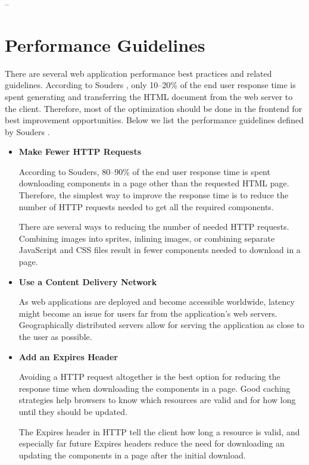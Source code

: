 --

\clearpage
\section{Performance Guidelines}
\label{section:performance-guidelines}

There are several web application performance best practices and
related guidelines. According to Souders \cite{souders2007high}, only
10--20\% of the end user response time is spent generating and
transferring the HTML document from the web server to the
client. Therefore, most of the optimization should be done in the
frontend for best improvement opportunities. Below we list the
performance guidelines defined by Souders \cite{souders2007high,
  souders2009even}.

\begin{itemize}


\item \textbf{Make Fewer HTTP Requests}

  According to Souders, 80--90\% of the end user response time is
  spent downloading components in a page other than the requested HTML
  page. Therefore, the simplest way to improve the response time is to
  reduce the number of HTTP requests needed to get all the required
  components.

  There are several ways to reducing the number of needed HTTP
  requests. Combining images into sprites, inlining images, or
  combining separate JavaScript and CSS files result in fewer
  components needed to download in a page.

\item \textbf{Use a Content Delivery Network}

  As web applications are deployed and become accessible worldwide,
  latency might become an issue for users far from the application's
  web servers. Geographically distributed servers allow for serving
  the application as close to the user as possible.

\item \textbf{Add an Expires Header}

  Avoiding a HTTP request altogether is the best option for reducing
  the response time when downloading the components in a page. Good
  caching strategies help browsers to know which resources are valid
  and for how long until they should be updated.

  The Expires header in HTTP tell the client how long a resource is
  valid, and especially far future Expires headers reduce the need for
  downloading an updating the components in a page after the initial
  download.


\end{itemize}
